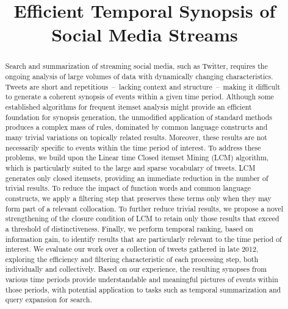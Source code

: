 \documentclass{sig-alternate}
\begin{document}
\title{Efficient Temporal Synopsis of Social Media Streams}

\maketitle
\begin{abstract}


Search and summarization of streaming social media, such as Twitter, requires the ongoing analysis of large volumes of data with dynamically changing characteristics.  Tweets are short and repetitious~--~lacking context and structure~--~making it difficult to generate a coherent synopsis of events within a given time period.  Although some established algorithms for frequent itemset analysis might provide an efficient foundation for synopsis generation, the unmodified application of standard methods produces a complex mass of rules, dominated by common language constructs and many trivial variations on topically related results.  Moreover, these results are not necessarily specific to events within the time period of interest.  To address these problems, we build upon the Linear time Closed itemset Mining (LCM) algorithm, which is particularly suited to the large and sparse vocabulary of tweets.  LCM generates only closed itemsets, providing an immediate reduction in the number of trivial results.  To reduce the impact of function words and common language constructs, we apply a filtering step that preserves these terms only when they may form part of a relevant collocation.  To further reduce trivial results, we propose a novel strengthening of the closure condition of LCM to retain only those results that exceed a threshold of distinctiveness.  Finally, we perform temporal ranking, based on information gain, to identify results that are particularly relevant to the time period of interest.  We evaluate our work over a collection of tweets gathered in late 2012, exploring the efficiency and filtering characteristic of each processing step, both individually and collectively.  Based on our experience, the resulting synopses from various time periods provide understandable and meaningful pictures of events within those periods, with potential application to tasks such as temporal summarization and query expansion for search.
\end{abstract}
\end{document}
